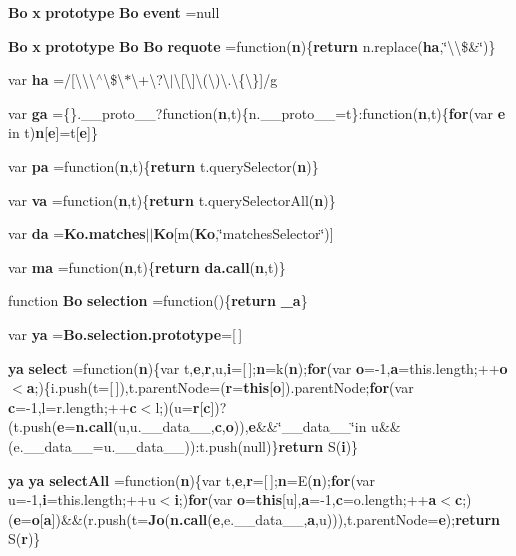 \begin{DoxyCompactItemize}
\item 
{\bf Bo} {\bf x} {\bf prototype} {\bf Bo} {\bf event} =null
\item 
{\bf Bo} {\bf x} {\bf prototype} {\bf Bo} {\bf Bo} {\bf requote} =function({\bf n})\{{\bf return} n.\+replace({\bf ha},\char`\"{}\textbackslash{}\textbackslash{}\$\&\char`\"{})\}
\item 
var {\bf ha} =/[\textbackslash{}\textbackslash{}\textbackslash{}$^\wedge$\textbackslash{}\$\textbackslash{}$\ast$\textbackslash{}+\textbackslash{}?\textbackslash{}$\vert$\textbackslash{}[\textbackslash{}]\textbackslash{}(\textbackslash{})\textbackslash{}.\textbackslash{}\{\textbackslash{}\}]/g
\item 
var {\bf ga} =\{\}.\+\_\+\+\_\+proto\+\_\+\+\_\+?function({\bf n},t)\{n.\+\_\+\+\_\+proto\+\_\+\+\_\+=t\}\+:function({\bf n},t)\{{\bf for}(var {\bf e} in t){\bf n}[{\bf e}]=t[{\bf e}]\}
\item 
var {\bf pa} =function({\bf n},t)\{{\bf return} t.\+query\+Selector({\bf n})\}
\item 
var {\bf va} =function({\bf n},t)\{{\bf return} t.\+query\+Selector\+All({\bf n})\}
\item 
var {\bf da} ={\bf Ko.\+matches}$\vert$$\vert${\bf Ko}[m({\bf Ko},\char`\"{}matches\+Selector\char`\"{})]
\item 
var {\bf ma} =function({\bf n},t)\{{\bf return} {\bf da.\+call}({\bf n},t)\}
\item 
function {\bf Bo} {\bf selection} =function()\{{\bf return} {\bf \+\_\+a}\}
\item 
var {\bf ya} ={\bf Bo.\+selection.\+prototype}=[$\,$]
\item 
{\bf ya} {\bf select} =function({\bf n})\{var t,{\bf e},{\bf r},u,{\bf i}=[$\,$];{\bf n}=k({\bf n});{\bf for}(var {\bf o}=-\/1,{\bf a}=this.\+length;++{\bf o}$<${\bf a};)\{i.\+push(t=[$\,$]),t.\+parent\+Node=({\bf r}={\bf this}[{\bf o}]).parent\+Node;{\bf for}(var {\bf c}=-\/1,l=r.\+length;++{\bf c}$<$l;)(u={\bf r}[{\bf c}])?(t.\+push({\bf e}={\bf n.\+call}(u,u.\+\_\+\+\_\+data\+\_\+\+\_\+,{\bf c},{\bf o})),{\bf e}\&\&\char`\"{}\+\_\+\+\_\+data\+\_\+\+\_\+\char`\"{}in u\&\&(e.\+\_\+\+\_\+data\+\_\+\+\_\+=u.\+\_\+\+\_\+data\+\_\+\+\_\+))\+:t.\+push(null)\}{\bf return} S({\bf i})\}
\item 
{\bf ya} {\bf ya} {\bf select\+All} =function({\bf n})\{var t,{\bf e},{\bf r}=[$\,$];{\bf n}=E({\bf n});{\bf for}(var u=-\/1,{\bf i}=this.\+length;++u$<${\bf i};){\bf for}(var {\bf o}={\bf this}[u],{\bf a}=-\/1,{\bf c}=o.\+length;++{\bf a}$<${\bf c};)({\bf e}={\bf o}[{\bf a}])\&\&(r.\+push(t={\bf Jo}({\bf n.\+call}({\bf e},e.\+\_\+\+\_\+data\+\_\+\+\_\+,{\bf a},u))),t.\+parent\+Node={\bf e});{\bf return} S({\bf r})\}
$$
\end{DoxyCompactItemize}
